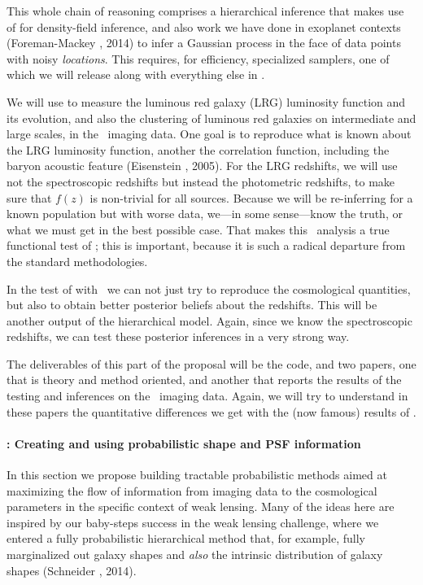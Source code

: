 \documentclass[12pt]{article}
\begin{document}
This whole chain of reasoning comprises a hierarchical inference that
makes use of  for density-field inference, and
also work we have done in exoplanet contexts (Foreman-Mackey \etal, 2014) to infer a
Gaussian process in the face of data points with noisy \emph{locations}.
This requires, for efficiency, specialized samplers, one
of which we will release along with everything else in
.

We will use  to measure the luminous red galaxy
(LRG) luminosity function and its evolution, and also the clustering
of luminous red galaxies on intermediate and large scales, in the
\sdss\ imaging data.
One goal is to reproduce what is known about the LRG luminosity
function, another the correlation function, including the baryon
acoustic feature (Eisenstein \etal, 2005).
For the LRG redshifts, we will use not the spectroscopic redshifts but
instead the photometric redshifts, to make sure that $f(z)$ is
non-trivial for all sources.
Because we will be re-inferring for a known population but with worse
data, we---in some sense---know the truth, or what we must get in the
best possible case.
That makes this \sdss\ analysis a true functional test of
; this is important, because it is such a radical
departure from the standard methodologies.

In the test of  with \sdss\ we can not just try to
reproduce the cosmological quantities, but also to obtain better
posterior beliefs about the redshifts.
This will be another output of the hierarchical model.
Again, since we know the spectroscopic redshifts, we can test these
posterior inferences in a very strong way.

The deliverables of this part of the proposal will be the
 code, and two papers, one that is theory and
method oriented, and another that reports the results of the testing
and inferences on the \sdss\ imaging data.
Again, we will try to understand in these papers the quantitative
differences we get with the (now famous) results of \sdss.

\paragraph{: Creating and using probabilistic shape and PSF information}

In this section we propose building tractable probabilistic methods aimed
at maximizing the flow of information from imaging data to the
cosmological parameters in the specific context of weak lensing.
Many of the ideas here are inspired by our baby-steps success in the
 weak lensing challenge, where we entered a fully
probabilistic hierarchical method that, for example, fully marginalized out
galaxy shapes and \emph{also} the intrinsic distribution of galaxy shapes
(Schneider \etal, 2014).
\end{document}
